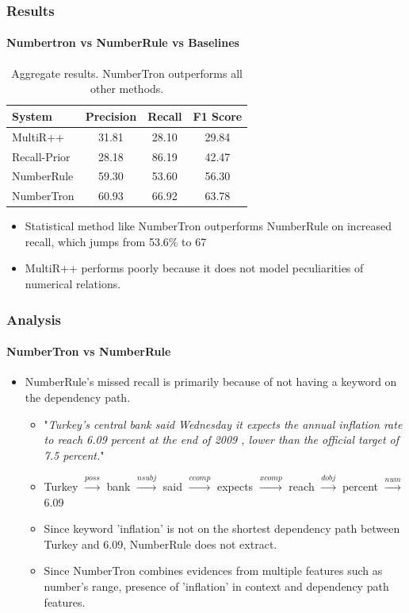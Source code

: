 \documentclass{beamer}
\begin{document}
\begin{frame}
\frametitle{Results}
\framesubtitle{Numbertron vs NumberRule vs Baselines}


\begin{small}
\begin{table}
\begin{tabular}{|l|c|c|c|}

\hline
\textbf{System} &  \textbf{Precision} & \textbf{Recall} & \textbf{F1 Score}\\
\hline 
\hline

MultiR++ & 31.81 & 28.10 & 29.84\\
\hline
Recall-Prior & 28.18 & 86.19 & 42.47\\
\hline
NumberRule & 59.30 & 53.60 & 56.30\\
\hline
NumberTron & 60.93 & 66.92 & 63.78 \\
\hline
\end{tabular}
\caption{Aggregate results. NumberTron outperforms all other methods.}
\label{main_results_table}
\end{table}
\end{small}
\begin{itemize}
\item Statistical method like NumberTron outperforms NumberRule on increased recall, which jumps from 53.6\% to 67%
\item MultiR++ performs poorly because it does not model peculiarities of numerical relations.
\end{itemize}
\end{frame}
\begin{frame}
\frametitle{Analysis}
\framesubtitle{NumberTron vs NumberRule}

\begin{itemize}
	\item NumberRule's missed recall is primarily because of not having a keyword on the dependency path.
    \begin{itemize}
    \setlength\itemsep{1em}
    	\item "{\em Turkey's central bank said Wednesday it expects the annual inflation rate to reach 6.09 percent at the end of 2009 , lower than the official target of 7.5 percent.}"
        \item Turkey $\xrightarrow{poss}$ bank $\xrightarrow{nsubj}$ said $\xrightarrow{ccomp}$ expects $\xrightarrow{xcomp}$ reach $\xrightarrow{dobj}$ percent $\xrightarrow{num}$ 6.09
        \item Since keyword 'inflation' is not on the shortest dependency path between Turkey and 6.09, NumberRule does not extract.
        \item Since NumberTron combines evidences from multiple features such as number's range, presence of 'inflation' in context and dependency path features.
    \end{itemize}
\end{itemize}


\end{frame}
\end{document}
